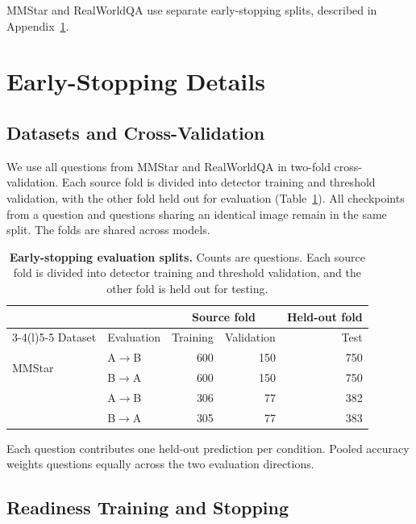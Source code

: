 \documentclass{article} %
\begin{document}
MMStar and RealWorldQA use separate early-stopping splits, described in Appendix~\ref{app:early_stopping}.

\section{Early-Stopping Details}
\label{app:early_stopping}

\subsection{Datasets and Cross-Validation}

We use all questions from MMStar and RealWorldQA in two-fold cross-validation. Each source fold is divided into detector training and threshold validation, with the other fold held out for evaluation (Table~\ref{tab:stopping_splits}). All checkpoints from a question and questions sharing an identical image remain in the same split. The folds are shared across models.

\begin{table}[H]
\centering
\small
\renewcommand{\arraystretch}{1.05}
\caption{\textbf{Early-stopping evaluation splits.} Counts are questions. Each source fold is divided into detector training and threshold validation, and the other fold is held out for testing.}
\label{tab:stopping_splits}
\begin{tabular*}{\textwidth}{@{\extracolsep{\fill}}llrrr@{}}
\toprule
& & \multicolumn{2}{c}{Source fold} & Held-out fold \\
\cmidrule(lr){3-4}\cmidrule(l){5-5}
Dataset & Evaluation & Training & Validation & Test \\
\midrule
\multirow{2}{*}{MMStar}
& A$\to$B & 600 & 150 & 750 \\
& B$\to$A & 600 & 150 & 750 \\
\addlinespace[3pt]
\multirow{2}{*}{RealWorldQA}
& A$\to$B & 306 & 77 & 382 \\
& B$\to$A & 305 & 77 & 383 \\
\bottomrule
\end{tabular*}
\end{table}

Each question contributes one held-out prediction per condition. Pooled accuracy weights questions equally across the two evaluation directions.

\subsection{Readiness Training and Stopping}
\end{document}
